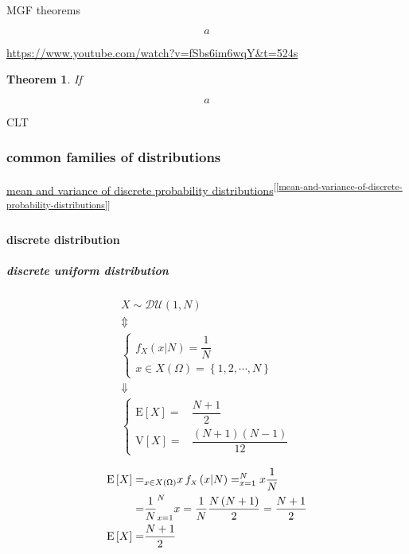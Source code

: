 \documentclass[
]{book}
\newtheorem{theorem}{Theorem}[chapter]
\theoremstyle{definition}
\theoremstyle{definition}
\theoremstyle{definition}
\theoremstyle{definition}
\theoremstyle{remark}
\begin{document}
MGF theorems

\[
a
\]

\url{https://www.youtube.com/watch?v=fSbs6im6wqY&t=524s}

\begin{theorem}
\protect\hypertarget{thm:unnamed-chunk-31}{}\label{thm:unnamed-chunk-31}If
\end{theorem}

\[
a
\]

CLT

\subsubsection{common families of distributions}\label{common-families-of-distributions}

\hyperref[mean-and-variance-of-discrete-probability-distributions]{mean and variance of discrete probability distributions}\textsuperscript{{[}\ref{mean-and-variance-of-discrete-probability-distributions}{]}}

\paragraph{discrete distribution}\label{discrete-distribution}

\subparagraph{discrete uniform distribution}\label{discrete-uniform-distribution}

\[
\begin{array}{c}
X\sim\mathcal{DU}\left(1,N\right)\\
\Updownarrow\\
\begin{cases}
f_{{\scriptscriptstyle X}}\left(x|N\right)=\dfrac{1}{N}\\
x\in X\left(\Omega\right)=\left\{ 1,2,\cdots,N\right\} 
\end{cases}\\
\Downarrow\\
\begin{cases}
\mathrm{E}\left[X\right]= & \dfrac{N+1}{2}\\
\mathrm{V}\left[X\right]= & \dfrac{\left(N+1\right)\left(N-1\right)}{12}
\end{cases}
\end{array}
\]

\[
\begin{aligned}
\mathrm{E}\left[X\right]= & \sum_{x\in X\left(\Omega\right)}x\thinspace f_{{\scriptscriptstyle X}}\left(x|N\right)=\sum_{x=1}^{N}x\dfrac{1}{N}\\
= & \dfrac{1}{N}\sum_{x=1}^{N}x=\dfrac{1}{N}\dfrac{N\left(N+1\right)}{2}=\dfrac{N+1}{2}\\
\mathrm{E}\left[X\right]= & \dfrac{N+1}{2}
\end{aligned}
\]
\end{document}
